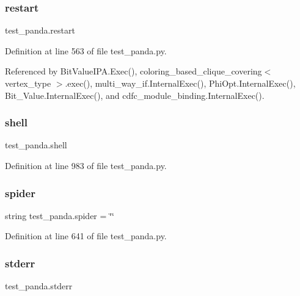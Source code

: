 \subsubsection{\texorpdfstring{restart}{restart}}
{\footnotesize\ttfamily test\+\_\+panda.\+restart}



Definition at line 563 of file test\+\_\+panda.\+py.



Referenced by Bit\+Value\+I\+P\+A.\+Exec(), coloring\+\_\+based\+\_\+clique\+\_\+covering$<$ vertex\+\_\+type $>$.\+exec(), multi\+\_\+way\+\_\+if.\+Internal\+Exec(), Phi\+Opt.\+Internal\+Exec(), Bit\+\_\+\+Value.\+Internal\+Exec(), and cdfc\+\_\+module\+\_\+binding.\+Internal\+Exec().

\mbox{\label{namespacetest__panda_a7410bf90915081b9dfdb2f34951501e9}} 
\subsubsection{\texorpdfstring{shell}{shell}}
{\footnotesize\ttfamily test\+\_\+panda.\+shell}



Definition at line 983 of file test\+\_\+panda.\+py.

\mbox{\label{namespacetest__panda_a925c8594b63c7578c449ad91c8a63f34}} 
\subsubsection{\texorpdfstring{spider}{spider}}
{\footnotesize\ttfamily string test\+\_\+panda.\+spider = \char`\"{}\char`\"{}}



Definition at line 641 of file test\+\_\+panda.\+py.

\mbox{\label{namespacetest__panda_a49ffe05060a5a34634f6a6f4f4e55f20}} 
\subsubsection{\texorpdfstring{stderr}{stderr}}
{\footnotesize\ttfamily test\+\_\+panda.\+stderr}



